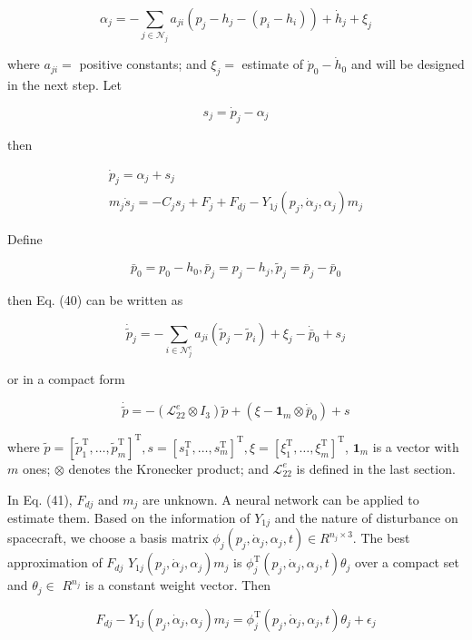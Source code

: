 \documentclass[10pt]{article}
\begin{document}
$$
\alpha_{j}=-\sum_{j \in \mathcal{N}_{j}} a_{j i}\left(p_{j}-h_{j}-\left(p_{i}-h_{i}\right)\right)+\dot{h}_{j}+\xi_{j}
$$

where $a_{j i}=$ positive constants; and $\xi_{j}=$ estimate of $\dot{p}_{0}-\dot{h}_{0}$ and will be designed in the next step. Let

$$
s_{j}=\dot{p}_{j}-\alpha_{j}
$$

then

$$
\begin{gathered}
\dot{p}_{j}=\alpha_{j}+s_{j} \\
m_{j} \dot{s}_{j}=-C_{j} s_{j}+F_{j}+F_{d j}-Y_{1 j}\left(p_{j}, \dot{\alpha}_{j}, \alpha_{j}\right) m_{j}
\end{gathered}
$$

Define

$$
\bar{p}_{0}=p_{0}-h_{0}, \bar{p}_{j}=p_{j}-h_{j}, \tilde{p}_{j}=\bar{p}_{j}-\bar{p}_{0}
$$

then Eq. (40) can be written as

$$
\dot{\tilde{p}}_{j}=-\sum_{i \in \mathcal{N}_{j}^{e}} a_{j i}\left(\tilde{p}_{j}-\tilde{p}_{i}\right)+\xi_{j}-\dot{\bar{p}}_{0}+s_{j}
$$

or in a compact form

$$
\dot{\tilde{p}}=-\left(\mathcal{L}_{22}^{e} \otimes I_{3}\right) \tilde{p}+\left(\xi-\mathbf{1}_{m} \otimes \dot{\bar{p}}_{0}\right)+s
$$

where $\tilde{p}=\left[\tilde{p}_{1}^{\mathrm{T}}, \ldots, \tilde{p}_{m}^{\mathrm{T}}\right]^{\mathrm{T}}, s=\left[s_{1}^{\mathrm{T}}, \ldots, s_{m}^{\mathrm{T}}\right]^{\mathrm{T}}, \xi=\left[\xi_{1}^{\mathrm{T}}, \ldots, \xi_{m}^{\mathrm{T}}\right]^{\mathrm{T}}$, $\mathbf{1}_{m}$ is a vector with $m$ ones; $\otimes$ denotes the Kronecker product; and $\mathcal{L}_{22}^{e}$ is defined in the last section.

In Eq. (41), $F_{d j}$ and $m_{j}$ are unknown. A neural network can be applied to estimate them. Based on the information of $Y_{1 j}$ and the nature of disturbance on spacecraft, we choose a basis matrix $\phi_{j}\left(p_{j}, \dot{\alpha}_{j}, \alpha_{j}, t\right) \in R^{n_{j} \times 3}$. The best approximation of $F_{d j}$ $Y_{1 j}\left(p_{j}, \dot{\alpha}_{j}, \alpha_{j}\right) m_{j}$ is $\phi_{j}^{\mathrm{T}}\left(p_{j}, \dot{\alpha}_{j}, \alpha_{j}, t\right) \theta_{j}$ over a compact set and $\theta_{j} \in$ $R^{n_{j}}$ is a constant weight vector. Then

$$
F_{d j}-Y_{1 j}\left(p_{j}, \dot{\alpha}_{j}, \alpha_{j}\right) m_{j}=\phi_{j}^{\mathrm{T}}\left(p_{j}, \dot{\alpha}_{j}, \alpha_{j}, t\right) \theta_{j}+\epsilon_{j}
$$
\end{document}
